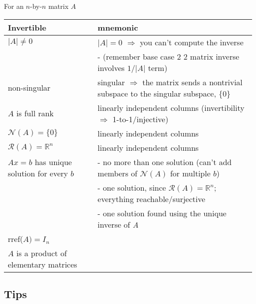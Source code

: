 \documentclass[10pt,letterpaper]{article}
\begin{document}
For an $n$-by-$n$ matrix $A$ 

\begin{center}
\begin{tabular}{ll}
 Invertible                                &  mnemonic                                                                                       \\
\hline
 $\vert A\vert \ne 0$                      &  $\vert A\vert = 0$ $\Rightarrow$ you can't compute the inverse                                 \\
                                           &  - (remember base case 2 \texttimes{} 2 matrix inverse involves $1/\vert A\vert$ term)          \\
 non-singular                              &  singular $\Rightarrow$ the matrix sends a nontrivial subspace to the singular subspace, \{0\}  \\
 $A$ is full rank                          &  linearly independent columns (invertibility $\Rightarrow$ 1-to-1/injective)                    \\
 $\mathcal{N}(A)=\{0\}$                    &  linearly independent columns                                                                   \\
 $\mathcal R (A)= \mathbb{R}^{n}$          &  linearly independent columns                                                                   \\
 $Ax=b$ has unique solution for every $b$  &  - no more than one solution (can't add members of $\mathcal N (A)$ for multiple $b$)           \\
                                           &  - one solution, since $\mathcal R (A)= \mathbb{R}^{n}$; everything reachable/surjective        \\
                                           &  - one solution found using the unique inverse of \emph{A}                                      \\
 rref($A)=I_n$                             &                                                                                                 \\
 $A$ is a product of elementary matrices   &                                                                                                 \\
\end{tabular}
\end{center}
\subsection{Tips}
\label{sec-20_3}
\end{document}
